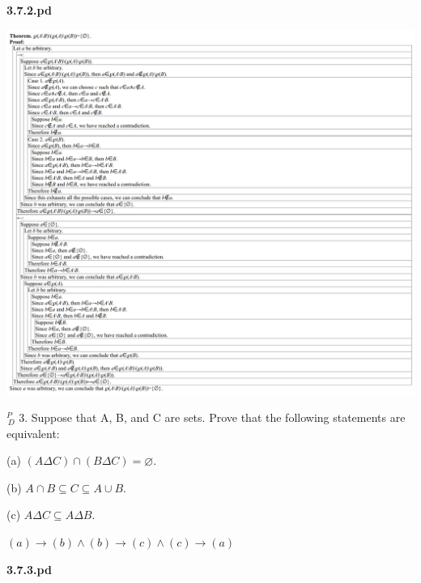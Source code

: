 \documentclass{article}
\begin{document}
\textbf{3.7.2.pd}
\vspace{10pt}

\includegraphics[width=\textwidth,height=\textheight,keepaspectratio]{3_7_2}

\vspace{30pt}

$^{\textit{P}}_{\, \textit{D}}$ 3. Suppose that A, B, and C are sets. Prove that the following statements
are equivalent:

\hspace{12pt}(a) $(A \Delta C) \cap (B \Delta C) = \varnothing$.

\hspace{12pt}(b) $A \cap B \subseteq C \subseteq A \cup B$.

\hspace{12pt}(c) $A \Delta C \subseteq A \Delta B$.

$(a) \to (b) \land (b) \to (c) \land (c) \to (a)$ 

\textbf{3.7.3.pd}
\vspace{10pt}
\end{document}

